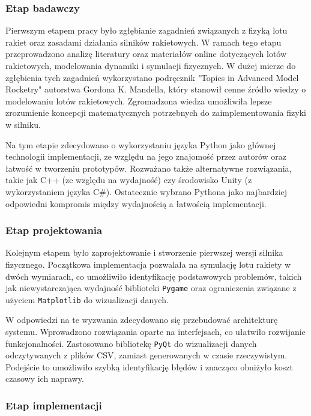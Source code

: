 \subsubsection{Etap badawczy}

Pierwszym etapem pracy było zgłębianie zagadnień związanych z fizyką lotu
rakiet oraz zasadami działania silników rakietowych. W ramach tego etapu
przeprowadzono analizę literatury oraz materiałów online dotyczących lotów
rakietowych, modelowania dynamiki i symulacji fizycznych. W dużej mierze do
zgłębienia tych zagadnień wykorzystano podręcznik "Topics in Advanced Model
Rocketry" autorstwa Gordona K. Mandella\cite{alma991019564819703276}, który stanowił cenne źródło wiedzy
o modelowaniu lotów rakietowych.
Zgromadzona
wiedza umożliwiła lepsze zrozumienie koncepcji matematycznych potrzebnych do zaimplementowania fizyki w silniku.

Na tym etapie zdecydowano o wykorzystaniu języka Python jako głównej technologii implementacji, ze względu na jego znajomość przez autorów oraz łatwość w tworzeniu prototypów. Rozważano także alternatywne rozwiązania, takie jak C++ (ze względu na wydajność) czy środowisko Unity (z wykorzystaniem języka C\#). Ostatecznie wybrano Pythona jako najbardziej odpowiedni kompromis między wydajnością a łatwością implementacji.

\subsubsection{Etap projektowania}

Kolejnym etapem było zaprojektowanie i stworzenie pierwszej wersji silnika fizycznego. Początkowa implementacja pozwalała na symulację lotu rakiety w dwóch wymiarach, co umożliwiło identyfikację podstawowych problemów, takich jak niewystarczająca wydajność biblioteki \texttt{Pygame} oraz ograniczenia związane z użyciem \texttt{Matplotlib} do wizualizacji danych.

W odpowiedzi na te wyzwania zdecydowano się przebudować architekturę systemu. Wprowadzono rozwiązania oparte na interfejsach, co ułatwiło rozwijanie funkcjonalności. Zastosowano bibliotekę \texttt{PyQt} do wizualizacji danych odczytywanych z plików CSV, zamiast generowanych w czasie rzeczywistym. Podejście to umożliwiło szybką identyfikację błędów i znacząco obniżyło koszt czasowy ich naprawy.

\subsubsection{Etap implementacji}

